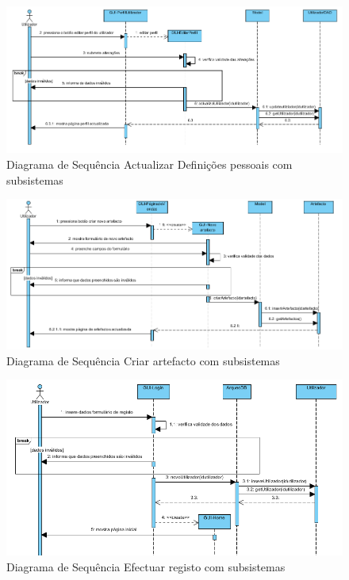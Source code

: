 \documentclass[12pt,a4paper]{article}
\begin{document}
\begin{figure}[h!]
\centering
\includegraphics[scale=0.7]{sequencia/est_actualizardef}
\caption{Diagrama de Sequência Actualizar Definições pessoais com subsistemas} 
\end{figure} 

\begin{figure}[h!]
\centering
\includegraphics[scale=0.7]{sequencia/est_criarartefacto}
\caption{Diagrama de Sequência Criar artefacto com subsistemas} 
\end{figure}   

\begin{figure}[h!]
\centering
\includegraphics[scale=0.7]{sequencia/est_registo}
\caption{Diagrama de Sequência Efectuar registo com subsistemas} 
\end{figure}  
\end{document}
